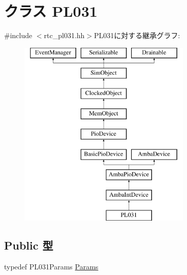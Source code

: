 \hypertarget{classPL031}{
\section{クラス PL031}
\label{classPL031}
}


{\ttfamily \#include $<$rtc\_\-pl031.hh$>$}PL031に対する継承グラフ:\begin{figure}[H]
\begin{center}
\leavevmode
\includegraphics[height=9cm]{classPL031}
\end{center}
\end{figure}
\subsection*{Public 型}
\begin{DoxyCompactItemize}
\item 
typedef PL031Params \hyperlink{classPL031_acd44fa02a8cc03d321b406d70faea0d8}{Params}
\end{DoxyCompactItemize}
